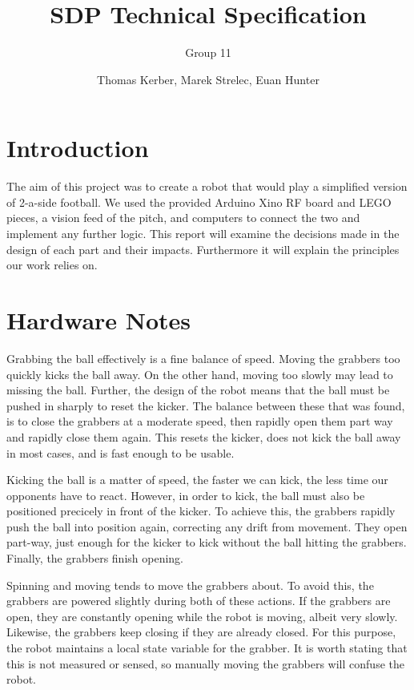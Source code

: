 \documentclass[a4paper,12pt]{scrartcl}
\author{Thomas Kerber, Marek Strelec, Euan Hunter}
\title{SDP Technical Specification}
\subtitle{Group 11}
\begin{document}
\maketitle

\section{Introduction}

The aim of this project was to create a robot that would play a simplified
version of 2-a-side football. We used the provided Arduino Xino RF board and
LEGO pieces, a vision feed of the pitch, and computers to connect the two and
implement any further logic. This report will examine the decisions made in the
design of each part and their impacts. Furthermore it will explain the
principles our work relies on.





\section{Hardware Notes}

Grabbing the ball effectively is a fine balance of speed. Moving the grabbers
too quickly kicks the ball away. On the other hand, moving too slowly may lead
to missing the ball. Further, the design of the robot means that the ball must
be pushed in sharply to reset the kicker. The balance between these that was
found, is to close the grabbers at a moderate speed, then rapidly open them
part way and rapidly close them again. This resets the kicker, does not kick the ball away in most cases, and is fast enough to be usable.

Kicking the ball is a matter of speed, the faster we can kick, the less time
our opponents have to react. However, in order to kick, the ball must also be
positioned precicely in front of the kicker. To achieve this, the grabbers
rapidly push the ball into position again, correcting any drift from movement.
They open part-way, just enough for the kicker to kick without the ball
hitting the grabbers. Finally, the grabbers finish opening.

Spinning and moving tends to move the grabbers about. To avoid this, the
grabbers are powered slightly during both of these actions. If the grabbers are
open, they are constantly opening while the robot is moving, albeit very
slowly. Likewise, the grabbers keep closing if they are already closed. For
this purpose, the robot maintains a local state variable for the grabber. It is
worth stating that this is not measured or sensed, so manually moving the
grabbers will confuse the robot.
\end{document}

